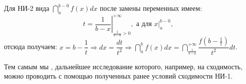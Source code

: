 \begin{note}
	
	Для НИ-2 вида $\dint\limits_{a}^{b-0}f(x)dx$ после замены переменных имеем:
	\begin{equation*}
	t = \left.\dfrac{1}{b-x} \right|_{\frac{1}{b-a	} > 0}^{+ \infty}, \text{ а для } \left.x\right|_{a}^{b-0},
	\end{equation*}
	отсюда получаем: $x = b - \dfrac{1}{t} \Rightarrow dx = \dfrac{dt}{t^2} \Rightarrow \dint\limits_{a}^{b} f(x)dx = \dint\limits_{\frac{1}{b-a}}^{+\infty} \dfrac{f(b-\frac{1}{t})}{t^2}dt$.
	
	Тем самым мы , дальнейшее исследование которого, например, на сходимость, можно проводить с помощью полученных ранее условий сходимости НИ-1.
\end{note}